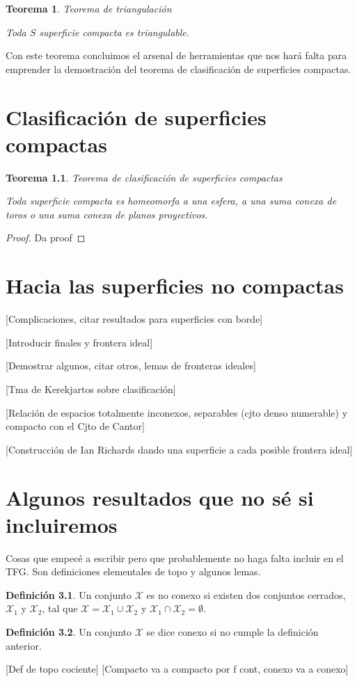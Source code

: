 \documentclass[a4paper,11pt,spanish, twoside, leqno]{tfg-uam}
\newtheorem{teor}{Teorema}[chapter]
\theoremstyle{definition}
\newtheorem{defin}[teor]{Definici\'on}
\begin{document}
\begin{teor}{Teorema de triangulación}\label{teor:teoremaDeTriangulacion}	
	
	Toda $S$ superficie compacta es triangulable.
\end{teor}

Con este teorema concluimos el arsenal de herramientas que nos hará falta para emprender la demostración del teorema de clasificación de superficies compactas.






\chapter{Clasificación de superficies compactas}

\begin{teor}{Teorema de clasificación de superficies compactas}\label{teor:teoremadeclasificacion}
	
	Toda superficie compacta es homeomorfa a una esfera, a una suma conexa de toros o una suma conexa de planos proyectivos.
\end{teor}
\begin{proof}
Da proof
\end{proof}

\chapter{Hacia las superficies no compactas}
[Complicaciones, citar resultados para superficies con borde]

[Introducir finales y frontera ideal]

[Demostrar algunos, citar otros, lemas de fronteras ideales]

[Tma de Kerekjartos sobre clasificación]

[Relación de espacios totalmente inconexos, separables (cjto denso 
numerable) y compacto con el Cjto de Cantor]

[Construcción de Ian Richards dando una superficie a cada posible frontera ideal]

\chapter{Algunos resultados que no sé si incluiremos}
Cosas que empecé a escribir pero que probablemente no haga falta incluir en el TFG. Son definiciones elementales de topo y algunos lemas.

\begin{defin}
	Un conjunto $\mathcal{X}$ es no conexo si existen dos  conjuntos cerrados, $\mathcal{X}_1$ y $\mathcal{X}_2$, tal que $\mathcal{X}=\mathcal{X}_1\cup\mathcal{X}_2$ y $\mathcal{X}_1\cap\mathcal{X}_2=\emptyset$.
\end{defin}
\begin{defin}
	Un conjunto $\mathcal{X}$ se dice conexo si no cumple la definición anterior.
\end{defin}
[Def de topo cociente]
[Compacto va a compacto por f cont, conexo va a conexo]
\end{document}
